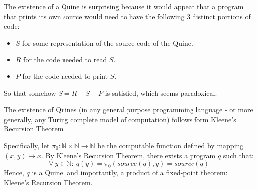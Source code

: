 
The existence of a Quine is surprising because it would appear that a program that prints its own source would need to have the following 3 distinct portions of code:

\begin{itemize}
\item $S$ for some representation of the source code of the Quine.
\item $R$ for the code needed to read $S$.
\item $P$ for the code needed to print $S$.
\end{itemize}
So that somehow $S = R + S + P$ is satisfied, which seems paradoxical.

The existence of Quines (in any general purpose programming language - or more generally, any Turing complete model of computation) follows form Kleene's Recursion Theorem.

Specifically, let $\pi_0: \mathbb{N} \times \mathbb{N} \rightarrow \mathbb{N}$ be the computable function defined by mapping $(x, y) \mapsto x$. By Kleene's Recursion Theorem, there exists a program $q$ such that:
\begin{equation*}
    \forall\ y \in \mathbb{N}:\ q(y) = \pi_0(source(q), y) = source(q)
\end{equation*}
Hence, $q$ is a Quine, and importantly, a product of a fixed-point theorem: Kleene's Recursion Theorem.